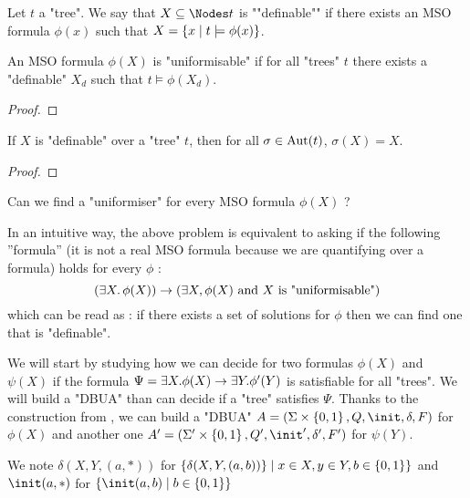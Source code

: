 \documentclass{article}
\begin{document}
\begin{definition}
	Let $t$ a "tree". We say that $X \subseteq \Nodes t$ is ""definable"" if there exists an MSO formula $\phi(x)$ such that $ X = \left\{x \mid t \models \phi(x)\right\}$.
\end{definition}

\begin{lemma}
	An MSO formula $\phi(X)$ is "uniformisable" if for all "trees" $t$ there exists a "definable" $X_d$ such that $t \models \phi(X_d)$.
\end{lemma}

\begin{proof}
	\todo{~}
\end{proof}

\begin{lemma}\label{lem:def-aut}
	If $X$ is "definable" over a "tree" $t$, then for all $\sigma \in \text{Aut}(t)$, $\sigma(X) = X$.
\end{lemma}

\begin{proof}
	\todo{~}

\end{proof}

\begin{problem}
Can we find a "uniformiser" for every MSO formula $\phi(X)$ ?
\end{problem}


In an intuitive way, the above problem is equivalent to asking if the following ''formula'' (it is not a real MSO formula
because we are quantifying over a formula) holds for every $\phi$ :
\[ (\exists X.\, \phi(X)) \rightarrow (\exists X, \phi(X) \text{ and $X$ is "uniformisable"})\]
which can be read as : if there exists a set of solutions for $\phi$ then we can find one that is "definable".

We will start by studying how we can decide for two formulas $\phi(X)$ and $\psi(X)$ if the formula $\Psi = \exists X. \phi (X) \rightarrow \exists Y. \phi' (Y)$
is satisfiable for all "trees". We will build a "DBUA" than can decide if a "tree" satisfies $\Psi$.
Thanks to the construction from , we can build a "DBUA" $A = (\Sigma \times \set{0,1}, Q, \init, \delta, F)$ for $\phi(X)$
and another one $A' = (\Sigma' \times \set{0,1}, Q', \init', \delta', F')$ for $\psi(Y)$.


\begin{notation}
	We note $\delta(X,Y, (a, *))$ for $\{ \delta(X,Y,(a,b)) \}  \mid  x \in X, y \in Y, b \in \left\{0,1\right\}\}$ and
	$\init(a,*)$ for $\setdef{\init(a,b)} {b \in \set{0,1}}$
\end{notation}
\end{document}

